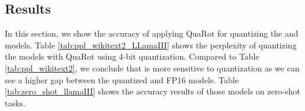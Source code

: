 \begin{table}[H]
    \centering
    \small
    \caption{
    Ablation on the precision of online Hadamard transformations for QuaRot. We use \wiki perplexity as well as zero-shot tasks, explained in Section \ref{sec:ablation_study}.
    }
    \vspace{1em}
\label{tab:fp16_had_results}
\end{table}


\subsection{\llamaIII Results}\label{sec:appx_llamaIII_acc}
In this section, we show the accuracy of applying QuaRot for quantizing the \llamaIIISmall and \llamaIIIBig models. Table \ref{tab:ppl_wikitext2_LLamaIII} shows the \wiki perplexity of quantizing the \llamaIII models with QuaRot using 4-bit quantization. Compared to Table \ref{tab:ppl_wikitext2}, we conclude that \llamaIII is more sensitive to quantization as we can see a higher gap between the quantized and FP16 models. Table \ref{tab:zero_shot_llamaIII} shows the accuracy results of those models on zero-shot tasks. 

